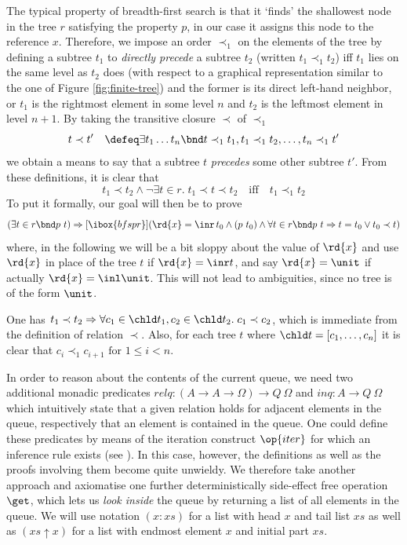 The typical property of breadth-first search is that it `finds' the shallowest
node in the tree $r$ satisfying the property $p$, \IE in our case it assigns
this node to the reference $x$. Therefore, we impose an order $\prec_1$ on the
elements of the tree by defining a subtree $t_1$ to \emph{directly precede} a
subtree $t_2$ (written $t_1 \prec_1 t_2$) iff $t_1$ lies on the same level as $t_2$
does (with respect to a graphical representation similar to the one of Figure
\ref{fig:finite-tree}) and the former is its direct left-hand neighbor, or $t_1$
is the rightmost element in some level $n$ and $t_2$ is the leftmost element in
level $n+1$. By taking the transitive closure $\prec$ of $\prec_1$
\[
t \prec t' \quad\defeq \exists t_1\ldots t_n\bnd t \prec_1 t_1, t_1 \prec_1 t_2, \ldots,  t_n \prec_1 t'
\]
we obtain a means to say that a subtree $t$ \emph{precedes} some other subtree
$t'$. From these definitions, it is clear that 
\[t_1 \prec t_2 \land \lnot \exists t \in r.\; t_1\prec t\prec t_2 \quad\text{iff}\quad t_1 \prec_1 t_2\]
To put it formally, our goal will then be  to prove
\[
  (\exists t \in r\bnd p\ t) \Rightarrow [\ibox{bfs p r}](\rd{x} = \inr\, t_0 \land (p\ t_0) \land \forall t \in r\bnd p\ t \Rightarrow t = t_0 \lor t_0 \prec t)
\]
where, in the following we will be a bit sloppy about the value of $\rd{x}$ and
use $\rd{x}$ in place of the tree $t$ if $\rd{x} = \inr t$, and say $\rd{x} =
\unit$ if actually $\rd{x} = \inl \unit$. This will not lead to ambiguities,
since no tree is of the form $\unit$.
\begin{rem}
\label{rem-chld}
One has $t_1 \prec t_2 \Rightarrow \forall c_1\in\chld t_1, c_2 \in \chld t_2.\; c_1 \prec
c_2$, which is immediate from the definition of relation $\prec$. Also, for 
each tree $t$ where $\chld t = [c_1,\ldots, c_n]$ it is clear that
$c_i \prec_{1} c_{i+1} \text{ for } 1\leq i<n$.
\end{rem}

In order to reason about the contents of the current queue, we need two
additional monadic predicates $relq : (A \to A \to \Omega) \to Q\ \Omega$ and $inq : A \to Q\ \Omega $
which intuitively state that a given relation holds for adjacent elements in the
queue, respectively that an element is contained in the queue. One could define
these predicates by means of the iteration construct $\op{iter}$ for which an
inference rule exists (see \cite{SchroederMossakowski:PDL}). In this case,
however, the definitions as well as the proofs involving them become quite
unwieldy. We therefore take another approach and axiomatise one further
deterministically side-effect free operation $\get$, which lets us
\emph{look inside} the queue by returning a list of all elements in the queue.
We will use notation $(x:xs)$ for a list with head $x$ and tail list $xs$ as
well as $(xs\uparrow x)$ for a list with endmost element $x$ and initial part $xs$.

